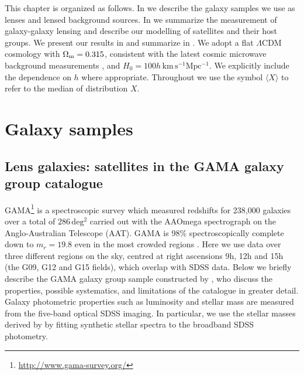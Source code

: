 This chapter is organized as follows. In  we describe the galaxy samples we use as 
lenses and lensed background sources. In  we summarize the measurement of 
galaxy-galaxy lensing and describe our modelling of satellites and their host groups. We present 
our results in  and summarize in . We adopt a flat $\Lambda$CDM 
cosmology with $\Omega_{\rm m}=0.315$, consistent with the latest cosmic microwave background 
measurements \citep{planck15xiii}, and $H_0=100h\,\mathrm{km\,s^{-1}Mpc^{-1}}$. We explicitly 
include the dependence on $h$ where appropriate. Throughout we use the symbol $\langle X \rangle$ to 
refer to the median of distribution $X$.

\section{Galaxy samples}\label{s:samples}

\subsection{Lens galaxies: satellites in the GAMA galaxy group catalogue}\label{s:gama}

GAMA\footnote{\url{http://www.gama-survey.org/}} is a spectroscopic survey which measured redshifts 
for 238,000 galaxies over a total of $286\,\mathrm{deg^2}$ carried out with the AAOmega 
spectrograph on the Anglo-Australian Telescope (AAT). GAMA is 98\% spectroscopically complete down 
to $m_r=19.8$ even in the most crowded regions \citep{baldry10,driver11,liske15}. Here we use data 
over three different regions on the sky, centred at right ascensions 9h, 12h and 15h (the G09, G12 
and G15 fields), which overlap with SDSS data. Below we briefly describe the GAMA galaxy group 
sample constructed by \cite{robotham11}, who discuss the properties, possible systematics, and 
limitations of the catalogue in greater detail. Galaxy photometric properties such as luminosity 
and stellar mass are measured from the five-band optical SDSS imaging. In particular, we use the 
stellar masses derived by \cite{taylor11} by fitting \cite{bruzual03} synthetic stellar spectra to 
the broadband SDSS photometry.

